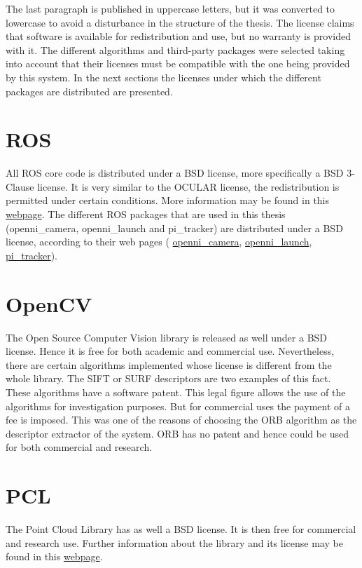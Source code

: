 	The last paragraph is published in uppercase letters, but it was converted to lowercase to avoid a disturbance in the structure of the thesis. 	
	The license claims that software is available for redistribution and use, but no warranty is provided with it. 
	The different algorithms and third-party packages were selected taking into account that their licenses must be compatible with the one being provided by this system. 
	In the next sections the licenses under which the different packages are distributed are presented. 


	\section{ROS}
	All ROS core code is distributed under a BSD license, more specifically a BSD 3-Clause license. 
	It is very similar to the OCULAR license, the redistribution is permitted under certain conditions. 
	More information may be found in this \href{http://opensource.org/licenses/BSD-3-Clause}{\color{blue} {webpage}}. 
	The different ROS packages that are used in this thesis (openni\_camera, openni\_launch and pi\_tracker) are distributed under a BSD license, according to their web pages ( \href{http://wiki.ros.org/openni_camera}{openni\_camera}, \href{http://wiki.ros.org/openni_launch}{openni\_launch}, \href{http://wiki.ros.org/pi_tracker}{pi\_tracker}).

	\section{OpenCV}
	The Open Source Computer Vision library is released as well under a BSD license. 
	Hence it is free for both academic and commercial use. 
	Nevertheless, there are certain algorithms implemented whose license is different from the whole library. 
	The SIFT or SURF descriptors are two examples of this fact. 
	These algorithms have a software patent. 
	This legal figure allows the use of the algorithms for investigation purposes. 
	But for commercial uses the payment of a fee is imposed. 
	This was one of the reasons of choosing the ORB algorithm as the descriptor extractor of the system. 
	ORB has no patent and hence could be used for both commercial and research. 

	\section{PCL}
	The Point Cloud Library has as well a BSD license. 
	It is then free for commercial and research use. 
	Further information about the library and its license may be found in this \href{http://pointclouds.org}{\color{blue} {webpage}}. 


